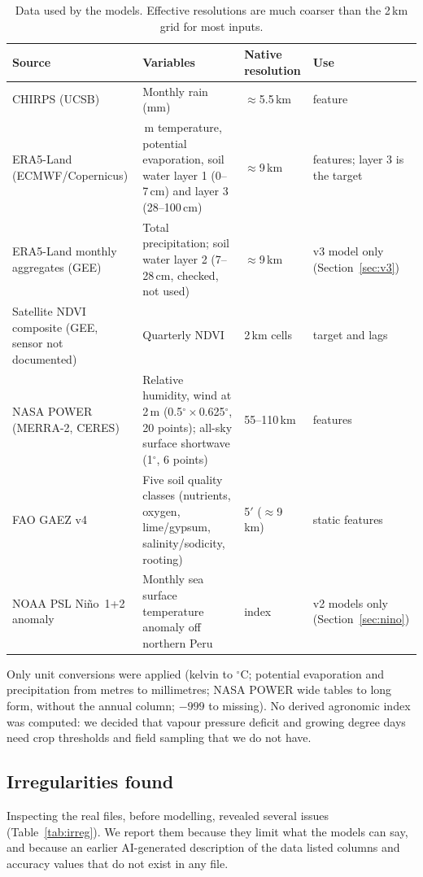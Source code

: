 \documentclass[11pt,a4paper]{article}
\begin{document}
\begin{table}[H]
\centering\small
\caption{Data used by the models. Effective resolutions are much coarser than the 2\,km grid for most inputs.}
\label{tab:data}
\begin{tabularx}{\textwidth}{>{\raggedright\arraybackslash}p{3.6cm}>{\raggedright\arraybackslash}Xp{2.2cm}p{2.4cm}}
\toprule
Source & Variables & Native resolution & Use \\
\midrule
CHIRPS (UCSB) \citep{funk2015} & Monthly rain (mm) & $\approx$5.5\,km & feature \\
ERA5-Land (ECMWF/Copernicus) \citep{munoz2021} & 2\,m temperature, potential evaporation, soil water layer 1 (0--7\,cm) and layer 3 (28--100\,cm) & $\approx$9\,km & features; layer 3 is the target \\
ERA5-Land monthly aggregates (GEE) & Total precipitation; soil water layer 2 (7--28\,cm, checked, not used) & $\approx$9\,km & v3 model only (Section~\ref{sec:v3}) \\
Satellite NDVI composite (GEE, sensor not documented) & Quarterly NDVI & 2\,km cells & target and lags \\
NASA POWER (MERRA-2, CERES) & Relative humidity, wind at 2\,m (0.5$^\circ\times$0.625$^\circ$, 20 points); all-sky surface shortwave (1$^\circ$, 6 points) & 55--110\,km & features \\
FAO GAEZ v4 \citep{fischer2021} & Five soil quality classes (nutrients, oxygen, lime/gypsum, salinity/sodicity, rooting) & 5$'$ ($\approx$9\,km) & static features \\
NOAA PSL Ni\~no~1+2 anomaly & Monthly sea surface temperature anomaly off northern Peru & index & v2 models only (Section~\ref{sec:nino}) \\
\bottomrule
\end{tabularx}
\end{table}

Only unit conversions were applied (kelvin to $^\circ$C; potential evaporation and precipitation from metres to
millimetres; NASA POWER wide tables to long form, without the annual column; $-999$ to missing). No derived agronomic
index was computed: we decided that vapour pressure deficit and growing degree days need crop thresholds and field
sampling that we do not have.

\subsection{Irregularities found}
Inspecting the real files, before modelling, revealed several issues (Table~\ref{tab:irreg}). We report them because
they limit what the models can say, and because an earlier AI-generated description of the data listed columns and
accuracy values that do not exist in any file.
\end{document}
